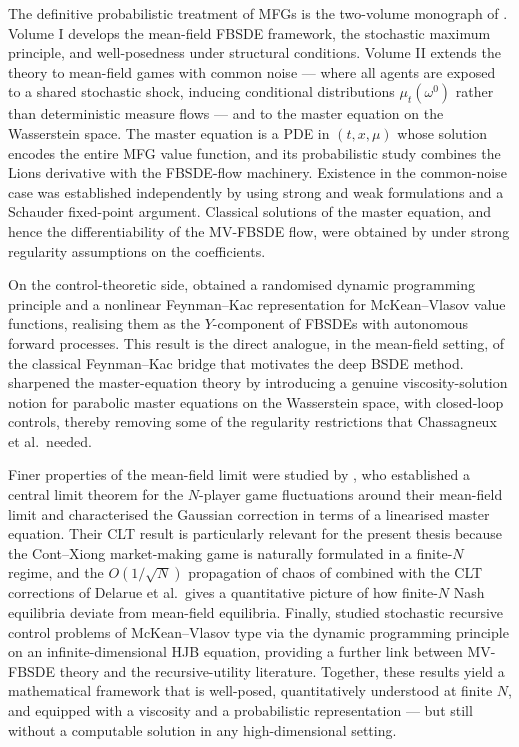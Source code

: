 The definitive probabilistic treatment of MFGs is the two-volume
monograph of \citet{carmona2018}.  Volume I develops the mean-field
FBSDE framework, the stochastic maximum principle, and
well-posedness under structural conditions.  Volume II extends the
theory to mean-field games with common noise — where all agents are
exposed to a shared stochastic shock, inducing conditional
distributions $\mu_t(\omega^0)$ rather than deterministic measure
flows — and to the master equation on the Wasserstein space.  The
master equation is a PDE in $(t, x, \mu)$ whose solution encodes the
entire MFG value function, and its probabilistic study combines the
Lions derivative with the FBSDE-flow machinery.  Existence in the
common-noise case was established independently by
\citet{carmona2016} using strong and weak formulations and a
Schauder fixed-point argument.  Classical solutions of the master
equation, and hence the differentiability of the MV-FBSDE flow, were
obtained by \citet{chassagneux2014} under strong
regularity assumptions on the coefficients.

On the control-theoretic side, \citet{bayraktar2018}
obtained a randomised dynamic programming principle and a nonlinear
Feynman--Kac representation for McKean--Vlasov value functions,
realising them as the $Y$-component of FBSDEs with autonomous
forward processes.  This result is the direct analogue, in the
mean-field setting, of the classical Feynman--Kac bridge that
motivates the deep BSDE method.  \citet{wuzhang2020} sharpened
the master-equation theory by introducing a genuine viscosity-solution
notion for parabolic master equations on the Wasserstein space, with
closed-loop controls, thereby removing some of the regularity
restrictions that Chassagneux et al.\ needed.

Finer properties of the mean-field limit were studied by
\citet{delarue2019}, who established a central limit theorem for
the $N$-player game fluctuations around their mean-field limit and
characterised the Gaussian correction in terms of a linearised
master equation.  Their CLT result is particularly relevant for the
present thesis because the Cont--Xiong market-making game is
naturally formulated in a finite-$N$ regime, and the $O(1/\sqrt{N})$
propagation of chaos of \citet{buckdahn2009limit} combined with the
CLT corrections of Delarue et al.\ gives a quantitative picture of
how finite-$N$ Nash equilibria deviate from mean-field equilibria.
Finally, \citet{zhang2023} studied stochastic recursive
control problems of McKean--Vlasov type via the dynamic programming
principle on an infinite-dimensional HJB equation, providing a
further link between MV-FBSDE theory and the recursive-utility
literature.  Together, these results yield a mathematical framework
that is well-posed, quantitatively understood at finite $N$, and
equipped with a viscosity and a probabilistic representation — but
still without a computable solution in any high-dimensional setting.

